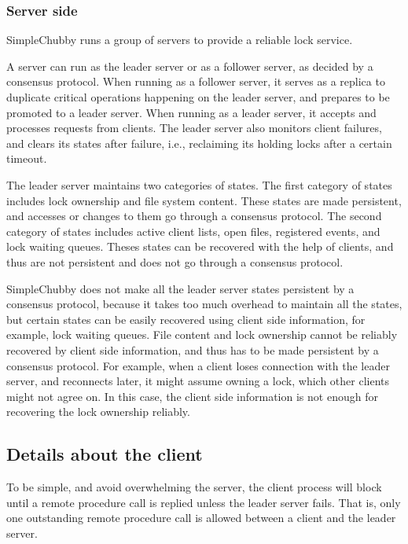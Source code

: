\subsubsection{Server side}

SimpleChubby runs a group of servers to provide a reliable lock service.

A server can run as the leader server or as a follower server,
as decided by a consensus protocol.
When running as a follower server, it serves as a replica to duplicate critical
operations happening on the leader server, and prepares to be promoted to a leader server.
When running as a leader server, it accepts and processes requests from clients.
The leader server also monitors client failures, and clears its states after failure,
i.e., reclaiming its holding locks after a certain timeout.

The leader server maintains two categories of states.
The first category of states includes lock ownership and file system content. These
states are made persistent, and accesses or changes to them go through a consensus protocol.
The second category of states includes active client lists,
open files, registered events, and lock waiting queues.
Theses states can be recovered with the help of clients,
and thus are not persistent and does not go through a consensus protocol.

SimpleChubby does not make all the leader server states persistent by a consensus protocol,
because it takes too much overhead to maintain all the states,
but certain states can be easily recovered
using client side information, for example, lock waiting queues.
File content and lock ownership cannot be reliably recovered by client
side information, and thus has to be made persistent by a consensus protocol.
For example, when a client loses connection with the leader server,
and reconnects later,
it might assume owning a lock, which other clients might not agree on.
In this case, the client side information is not enough for recovering
the lock ownership reliably.
 
\subsection{Details about the client}
To be simple, and avoid overwhelming the server, the client process will block until a remote procedure call is
replied unless the leader server fails. That is, only one outstanding remote procedure call is allowed between
a client and the leader server.

